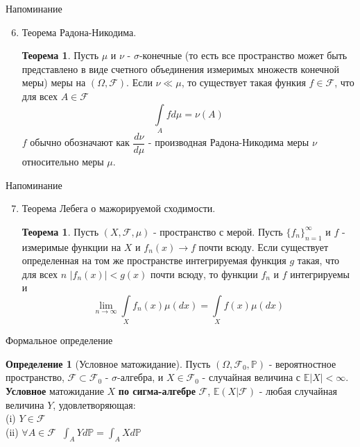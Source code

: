 \documentclass{beamer}%
\theoremstyle{definition}
\newtheorem{mytheor}[theorem]{Теорема}
\newtheorem{mydef}[theorem]{Определение}
\renewcommand{\P}{\mathbb{P}}
\newcommand{\F}{\mathcal{F}}
\begin{document}
\begin{frame}{Напоминание}

\begin{enumerate}
\setcounter{enumi}{5}
\item Теорема Радона-Никодима.
    \begin{mytheor}
    Пусть $\mu$ и $\nu$ - $\sigma$-конечные (то есть все пространство может быть представлено в виде счетного объединения измеримых множеств конечной меры) меры на $(\Omega, \F)$. Если $\nu\ll\mu$, то существует такая функия $f\in\F$, что для всех $A\in\F$
    $$\int\limits_Afd\mu=\nu(A)$$
    $f$ обычно обозначают как $\dfrac{d\nu}{d\mu}$ - производная Радона-Никодима меры $\nu$ относительно меры $\mu$.
    \end{mytheor}
\end{enumerate}

\end{frame}


\begin{frame}{Напоминание}

\begin{enumerate}
\setcounter{enumi}{6}
\item Теорема Лебега о мажорируемой сходимости.
    \begin{mytheor}
    Пусть $(X, \F, \mu)$ - пространство с мерой. Пусть $\{f_n\}_{n=1}^\infty$ и $f$ - измеримые функции на $X$ и $f_n(x)\to f$ почти всюду. Если существует определенная на том же пространстве интегрируемая функция $g$ такая, что для всех $n$ $|f_n(x)|<g(x)$ почти всюду, то функции $f_n$ и $f$ интегрируемы и
    $$\lim\limits_{n\to\infty}\int\limits_Xf_n(x)\mu(dx)=\int\limits_Xf(x)\mu(dx)$$
    \end{mytheor}
\end{enumerate}

\end{frame}


\begin{frame}{Формальное определение}

\begin{mydef}[Условное матожидание]
Пусть $(\Omega, \mathcal{F}_0, \P)$ - вероятностное пространство, $\F\subset\mathcal{F}_0$ - $\sigma$-алгебра, и $X\in\mathcal{F}_0$ - случайная величина с $\mathbb{E}|X|<\infty$. \textbf{Условное} матожидание $X$ \textbf{по сигма-алгебре} $\F$, $\mathbb{E}(X|\F)$ - любая случайная величина $Y$, удовлетворяющая:
\\
(i) $Y\in\F$
\\
(ii) $\forall A\in\F \:$ $\int_AYd\P=\int_AXd\P$
\end{mydef}

\end{frame}
\end{document}

